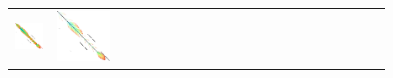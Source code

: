 \begin{figure}[t]
\begin{tabular}{l>{\centering}m{0.18\linewidth}>{\centering}m{0.18\linewidth}>{\centering}m{0.18\linewidth}>{\centering\arraybackslash}m{0.35\linewidth}}
    \includegraphics[scale=0.15]{imgs/comparison/sh.png} &
    \includegraphics[scale=0.15]{imgs/comparison/sh-noprune-dt.png} &

\end{tabular}
\end{figure}
